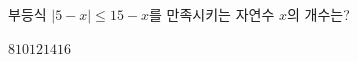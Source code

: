 부등식 $|5-x|\le 15-x$를 만족시키는 자연수 $x$의 개수는?
\begin{choices32}{$8$}{$10$}{$12$}{$14$}{$16$}\end{choices32}
